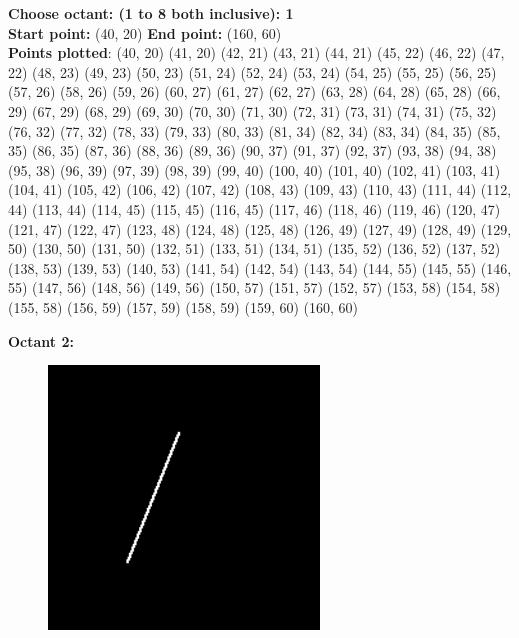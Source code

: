 \documentclass[12pt,letterpaper]{article}
\begin{document}
\textbf{Choose octant: (1 to 8 both inclusive): 1}\\
\textbf{Start point:} (40, 20)
\textbf{End point:} (160, 60)\\
\textbf{Points plotted}: 
(40, 20) (41, 20) (42, 21) (43, 21) 
(44, 21) (45, 22) (46, 22) (47, 22) 
(48, 23) (49, 23) (50, 23) (51, 24) 
(52, 24) (53, 24) (54, 25) (55, 25) 
(56, 25) (57, 26) (58, 26) (59, 26) 
(60, 27) (61, 27) (62, 27) (63, 28) 
(64, 28) (65, 28) (66, 29) (67, 29) 
(68, 29) (69, 30) (70, 30) (71, 30) 
(72, 31) (73, 31) (74, 31) (75, 32) 
(76, 32) (77, 32) (78, 33) (79, 33) 
(80, 33) (81, 34) (82, 34) (83, 34) 
(84, 35) (85, 35) (86, 35) (87, 36) 
(88, 36) (89, 36) (90, 37) (91, 37) 
(92, 37) (93, 38) (94, 38) (95, 38) 
(96, 39) (97, 39) (98, 39) (99, 40) 
(100, 40) (101, 40) (102, 41) (103, 41) 
(104, 41) (105, 42) (106, 42) (107, 42) 
(108, 43) (109, 43) (110, 43) (111, 44) 
(112, 44) (113, 44) (114, 45) (115, 45) 
(116, 45) (117, 46) (118, 46) (119, 46) 
(120, 47) (121, 47) (122, 47) (123, 48) 
(124, 48) (125, 48) (126, 49) (127, 49) 
(128, 49) (129, 50) (130, 50) (131, 50) 
(132, 51) (133, 51) (134, 51) (135, 52) 
(136, 52) (137, 52) (138, 53) (139, 53) 
(140, 53) (141, 54) (142, 54) (143, 54) 
(144, 55) (145, 55) (146, 55) (147, 56) 
(148, 56) (149, 56) (150, 57) (151, 57) 
(152, 57) (153, 58) (154, 58) (155, 58) 
(156, 59) (157, 59) (158, 59) (159, 60) 
(160, 60)

\newpage
\textbf{Octant 2:}
\begin{figure}[h]
    \centering
    \includegraphics[height=7cm]{Outputs/O2.png}
\end{figure}
\end{document}
